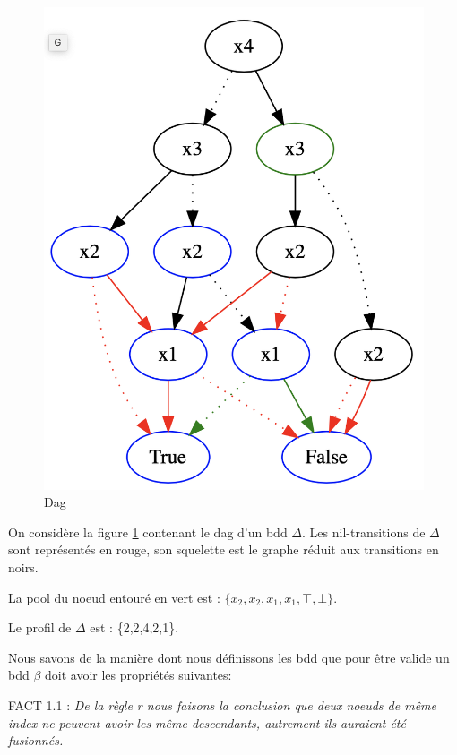 \documentclass[french]{article}
\begin{document}
\begin{figure}[htp]
    \centering
    \includegraphics[scale=0.35]{tree21_new.png}
    \caption{Dag}
    \label{fig:tree21_new}
\end{figure}
On considère la figure \ref{fig:tree21_new} contenant le dag d'un bdd \(\Delta\). Les nil-transitions de \(\Delta\) sont représentés en rouge, son squelette est le graphe réduit aux transitions en noirs.

La pool du noeud entouré en vert est : \(\{x_2,x_2,x_1,x_1,\top,\bot\}\). 

Le profil de \(\Delta\) est : \{2,2,4,2,1\}.

\vspace{5mm} 

Nous savons de la manière dont nous définissons les bdd que pour être valide un bdd \(\beta\) doit avoir les propriétés suivantes:

FACT 1.1 : \emph{De la règle r nous faisons la conclusion que deux noeuds de même index ne peuvent avoir les même descendants, autrement ils auraient été fusionnés.}
\end{document}
